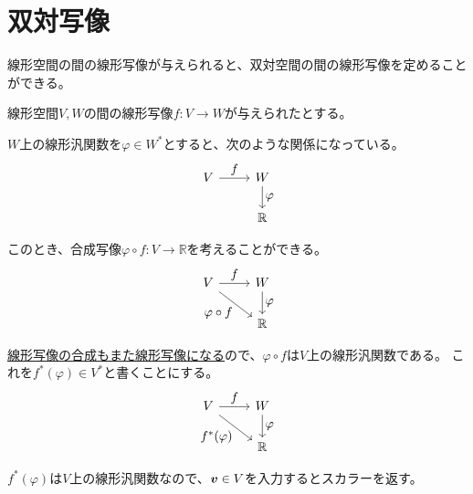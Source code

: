\documentclass[../../../topic_linear-algebra]{subfiles}
\begin{document}
\sectionline
\section{双対写像}

\begin{mindflow}
\end{mindflow}

線形空間の間の線形写像が与えられると、双対空間の間の線形写像を定めることができる。

\br

線形空間$V,W$の間の線形写像$f \colon V \to W$が与えられたとする。

$W$上の線形汎関数を$\varphi \in W^*$とすると、次のような関係になっている。
\begin{equation*}
  \begin{tikzcd}[every label/.append style = {font = \normalsize}]
    V \arrow[r,"f"] & W \arrow[d,"\varphi"]\\
    & \mathbb{R}
  \end{tikzcd}
\end{equation*}

このとき、合成写像$\varphi \circ f \colon V \to \mathbb{R}$を考えることができる。
\begin{equation*}
  \begin{tikzcd}[every label/.append style = {font = \normalsize}]
    V \arrow[r,"f"]\arrow[rd, "\varphi \circ f"'] & W \arrow[d,"\varphi"]\\
    & \mathbb{R}
  \end{tikzcd}
\end{equation*}

\hyperref[thm:linear-map-composition]{線形写像の合成もまた線形写像になる}ので、$\varphi \circ f$は$V$上の線形汎関数である。
これを$f^*(\varphi) \in V^*$と書くことにする。
\begin{equation*}
  \begin{tikzcd}[every label/.append style = {font = \normalsize}]
    V \arrow[r,"f"]\arrow[rd, "f^*(\varphi)"'] & W \arrow[d,"\varphi"]\\
    & \mathbb{R}
  \end{tikzcd}
\end{equation*}

$f^*(\varphi)$は$V$上の線形汎関数なので、$\vb*{v} \in V$を入力するとスカラーを返す。
\end{document}
